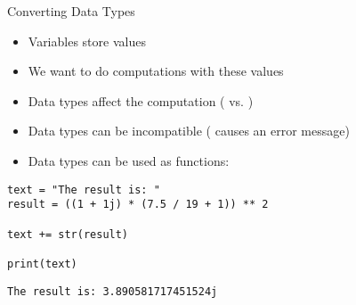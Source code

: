 
\begin{frame}[t,plain]
\titlepage
\end{frame}


\begin{frame}[fragile]{Converting Data Types}
%
\begin{itemize}
\item Variables store values
\item We want to do computations with these values
\item Data types affect the computation ( vs. )
\item Data types can be incompatible ( causes an error message)
\item Data types can be used as functions:  \thus~ 
\end{itemize}
%
\begin{codebox}[Code: Data Type Conversion, width=.5\linewidth, nobeforeafter, equal height group = grpToString]
\begin{verbatim}
text = "The result is: "
result = ((1 + 1j) * (7.5 / 19 + 1)) ** 2

text += str(result)

print(text)
\end{verbatim}
\end{codebox}
%
\begin{cmdbox}[Output: Data Type Conversion, width=.49\linewidth, nobeforeafter, equal height group = grpToString]
\begin{verbatim}
The result is: 3.890581717451524j
\end{verbatim}
\end{cmdbox}
%
\end{frame}


